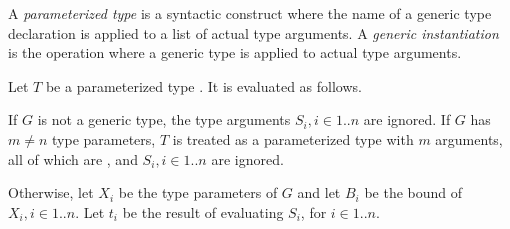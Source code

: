 \documentclass{article}
\begin{document}
%
%
%

\LMHash{}
A \emph{parameterized type} is a syntactic construct where the name of a generic type declaration is applied to a list of actual type arguments.
A \emph{generic instantiation} is the operation where a generic type is applied to actual type arguments.


\LMHash{}
Let $T$ be a parameterized type .
It is evaluated as follows.

\LMHash{}
If $G$ is not a generic type,
the type arguments $S_i, i \in 1 .. n$ are ignored.
If $G$ has $m \ne n$ type parameters, $T$ is treated as a parameterized type with $m$ arguments,
all of which are \DYNAMIC{},
and $S_i, i \in 1 .. n$ are ignored.


\LMHash{}
Otherwise, let $X_i$ be the type parameters of $G$ and let $B_i$ be the bound of $X_i, i \in 1 .. n$.
Let $t_i$ be the result of evaluating $S_i$, for $i \in 1 .. n$.
\end{document}
